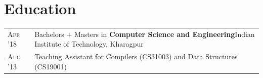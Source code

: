 \documentclass[a4paper,10pt]{extarticle} %
\begin{document}
\vspace{-2.3em}

\section{\textcolor{primary}{Education}}
\begin{tabularx}{\linewidth}{l | X}
\textsc{Apr '18} & Bachelors + Masters in \textbf{Computer Science and Engineering}\hspace{3.6em}\raisebox{-.2\height}{}\hspace{0.4em}Indian Institute of Technology, Kharagpur\\
\textsc{Aug '13} & Teaching Assistant for Compilers (CS31003) and Data Structures (CS19001)\\
\end{tabularx}


\end{document}
